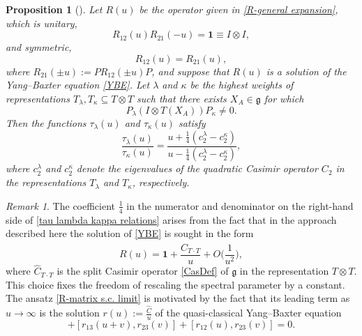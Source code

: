 \documentclass[a4paper]{article}
\newcommand{\hC}{\widehat{C}}
\renewcommand{\=}{\ =\ }
\numberwithin{equation}{section}
\newtheorem{proposition}{Proposition}
\theoremstyle{remark}
\newtheorem{remark}{Remark}
\begin{document}
\begin{proposition}[\cite{MacKay,IsQGLect}]\label{R-matrix general method}
Let $R(u)$ be the operator given in \eqref{R-general expansion}, which is unitary,
\begin{equation}\label{R-unitarity}
R_{12}(u)R_{21}(-u)=\mathbf{1}\equiv I\otimes I,
\end{equation}
and symmetric,
\begin{equation}\label{R-symmetry}
R_{12}(u)=R_{21}(u),
\end{equation}
where $R_{21}(\pm u):=P R_{12}(\pm u) P$, and suppose that $R(u)$ is a solution of the Yang--Baxter equation \eqref{YBE}. Let $\lambda$ and $\kappa$ be the highest weights of representations $T_\lambda,T_\kappa\subseteq T\otimes T$ such that there exists $X_A\in\mathfrak{g}$ for which
\begin{equation}\label{P_lambda X_a P_kappa}
P_\lambda(I\otimes T(X_A))P_\kappa\neq 0.
\end{equation}
Then the functions $\tau_\lambda(u)$ and $\tau_\kappa(u)$ satisfy
\begin{equation}\label{tau lambda kappa relations}
\frac{\tau_\lambda(u)}{\tau_\kappa(u)}=
\frac{u+\frac{1}{4}(c_{2}^\lambda-c_{2}^\kappa)}
     {u-\frac{1}{4}(c_{2}^\lambda-c_{2}^\kappa)},
\end{equation}
where $c_2^\lambda$ and $c_2^\kappa$ denote the eigenvalues of the quadratic Casimir operator $C_2$ in the representations $T_\lambda$ and $T_\kappa$, respectively.
\end{proposition}

\begin{remark}
The coefficient $\frac{1}{4}$ in the numerator and denominator on the right-hand side of \eqref{tau lambda kappa relations} arises from the fact that in the approach described here the solution of \eqref{YBE} is sought in the form
\begin{equation}\label{R-matrix s.c. limit}
R(u)=\mathbf{1}+\frac{\hC_{T\cdot T}}{u}+O\Big(\frac{1}{u^2}\Big),
\end{equation}
where $\hC_{T\cdot T}$ is the split Casimir operator \eqref{CasDef} of $\mathfrak{g}$ in the representation $T\otimes T$. This choice fixes the freedom of rescaling the spectral parameter by a constant. The ansatz \eqref{R-matrix s.c. limit} is motivated by the fact that its leading term as $u\to\infty$ is the solution $r(u):=\frac{\hC}{u}$ of the quasi-classical Yang--Baxter equation
\begin{equation}
[r_{12}(u),r_{13}(u+v)]
+[r_{13}(u+v),r_{23}(v)]
+[r_{12}(u),r_{23}(v)]=0.
\end{equation}
\end{remark}
\end{document}
